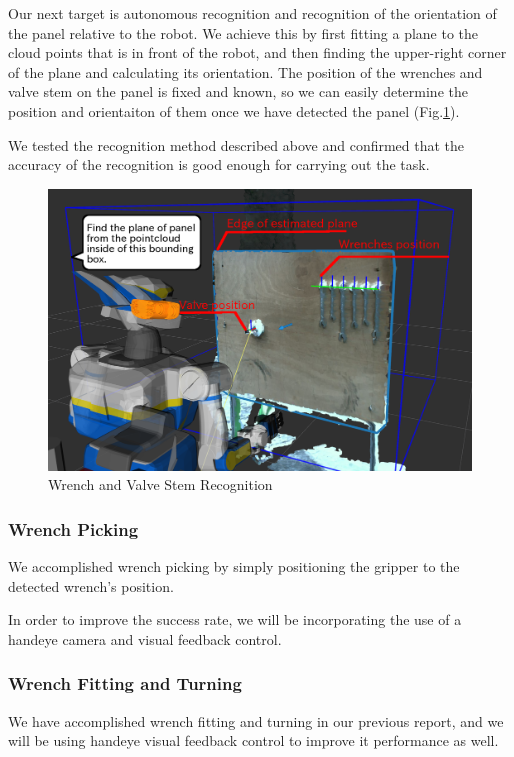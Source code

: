 Our next target is autonomous recognition and recognition of the orientation of the panel relative to the robot.
We achieve this by first fitting a plane to the cloud points that is in front of the robot, and then finding the upper-right corner of the plane and calculating its orientation.
The position of the wrenches and valve stem on the panel is fixed and known, so we can easily determine the position and orientaiton of them once we have detected the panel (Fig.\ref{fig: task2_object-recognition}).

We tested the recognition method described above and confirmed that the accuracy of the recognition is good enough for carrying out the task.

\begin{figure}[htb]
  \begin{center}
    \includegraphics[width=0.80\columnwidth]{sections/task2/images/wrench_valve_recog.png}
    \caption{Wrench and Valve Stem Recognition}
    \label{fig: task2_object-recognition}
  \end{center}
\end{figure}

\subsubsection{Wrench Picking}
We accomplished wrench picking by simply positioning the gripper to the detected wrench's position.

In order to improve the success rate, we will be incorporating the use of a handeye camera and visual feedback control.


\subsubsection{Wrench Fitting and Turning}
We have accomplished wrench fitting and turning in our previous report, and we will be using handeye visual feedback control to improve it performance as well.
